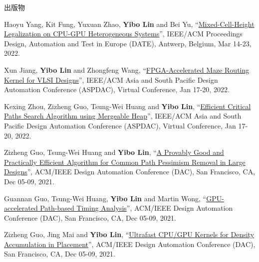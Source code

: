 \begin{rSection}{出版物}
\begin{description}[font=\normalfont, rightmargin=2em]
{}
            

\item[{[C57]}]{
        Haoyu Yang, Kit Fung, Yuxuan Zhao, \textbf{Yibo Lin} and Bei Yu, 
    ``\href{https://doi.org/10.23919/DATE54114.2022.9774671}{Mixed-Cell-Height Legalization on CPU-GPU Heterogeneous Systems}'', 
    IEEE/ACM Proceedings Design, Automation and Test in Europe (DATE), Antwerp, Belgium, Mar 14-23, 2022.
    
}
            

\item[{[C56]}]{
        Xun Jiang, \textbf{Yibo Lin} and Zhongfeng Wang, 
    ``\href{https://doi.org/10.1109/ASP-DAC52403.2022.9712533}{FPGA-Accelerated Maze Routing Kernel for VLSI Designs}'', 
    IEEE/ACM Asia and South Pacific Design Automation Conference (ASPDAC), Virtual Conference, Jan 17-20, 2022.
    
}
            

\item[{[C55]}]{
        Kexing Zhou, Zizheng Guo, Tsung-Wei Huang and \textbf{Yibo Lin}, 
    ``\href{https://doi.org/10.1109/ASP-DAC52403.2022.9712566}{Efficient Critical Paths Search Algorithm using Mergeable Heap}'', 
    IEEE/ACM Asia and South Pacific Design Automation Conference (ASPDAC), Virtual Conference, Jan 17-20, 2022.
    
}
            

\item[{[C54]}]{
        Zizheng Guo, Tsung-Wei Huang and \textbf{Yibo Lin}, 
    ``\href{https://doi.org/10.1109/DAC18074.2021.9586085}{A Provably Good and Practically Efficient Algorithm for Common Path Pessimism Removal in Large Designs}'', 
    ACM/IEEE Design Automation Conference (DAC), San Francisco, CA, Dec 05-09, 2021.
    
}
            

\item[{[C53]}]{
        Guannan Guo, Tsung-Wei Huang, \textbf{Yibo Lin} and Martin Wong, 
    ``\href{https://doi.org/10.1109/DAC18074.2021.9586316}{GPU-accelerated Path-based Timing Analysis}'', 
    ACM/IEEE Design Automation Conference (DAC), San Francisco, CA, Dec 05-09, 2021.
    
}
            

\item[{[C52]}]{
        Zizheng Guo, Jing Mai and \textbf{Yibo Lin}, 
    ``\href{https://doi.org/10.1109/DAC18074.2021.9586149}{Ultrafast CPU/GPU Kernels for Density Accumulation in Placement}'', 
    ACM/IEEE Design Automation Conference (DAC), San Francisco, CA, Dec 05-09, 2021.
    
}
\end{description}
\end{rSection}
